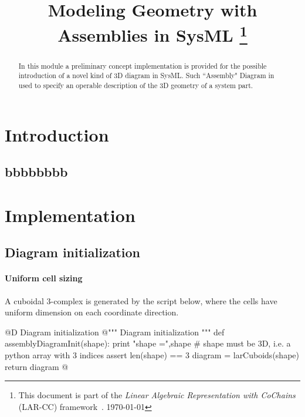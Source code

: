\documentclass[11pt,oneside]{article}	%
\title{Modeling Geometry with Assemblies in SysML
\footnote{This document is part of the \emph{Linear Algebraic Representation with CoChains} (LAR-CC) framework~\cite{cclar-proj:2013:00}. \today}
}
\begin{document}
\maketitle
\nonstopmode

\begin{abstract}
In this module a preliminary concept implementation is provided for the possible introduction of a novel kind of 3D diagram in SysML. Such ``Assembly" Diagram in used to specify an operable description of the 3D geometry of a system part.
\end{abstract}

\tableofcontents

\section{Introduction}
\subsection{bbbbbbbb}
\section{Implementation}
\subsection{Diagram initialization}

\paragraph{Uniform cell sizing}

A cuboidal 3-complex is generated by the script below, where the cells have uniform dimension on each coordinate direction. 

@D Diagram initialization
@{""" Diagram initialization """
def assemblyDiagramInit(shape):
	print "\n shape =",shape
	# shape must be 3D, i.e. a python array with 3 indices
	assert len(shape) == 3
	diagram = larCuboids(shape)
	return diagram
@}
\end{document}
